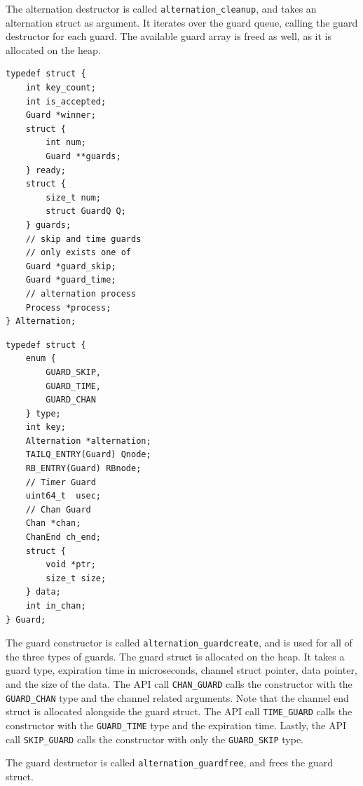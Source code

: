 The alternation destructor is called \texttt{alternation\_cleanup}, and takes an alternation struct as argument. It iterates over the guard queue, calling the guard destructor for each guard. The available guard array is freed as well, as it is allocated on the heap. 

\noindent\begin{minipage}{.45\textwidth}
\begin{lstlisting}[caption={Alternation type struct},style={CustomC},label={lst:alt_type_struct}]
typedef struct {
    int key_count;
    int is_accepted;
    Guard *winner;
    struct {
        int num;
        Guard **guards;
    } ready;
    struct {
        size_t num;
        struct GuardQ Q;
    } guards;
    // skip and time guards 
    // only exists one of
    Guard *guard_skip; 
    Guard *guard_time;
    // alternation process
    Process *process;
} Alternation;
\end{lstlisting}
\end{minipage}\hfill
\begin{minipage}{.45\textwidth}
\begin{lstlisting}[caption={Guard type struct},style={CustomC},label={lst:guard_type_struct}]
typedef struct {
    enum {
        GUARD_SKIP,
        GUARD_TIME,
        GUARD_CHAN
    } type;
    int key;
    Alternation *alternation;
    TAILQ_ENTRY(Guard) Qnode;
    RB_ENTRY(Guard) RBnode;
    // Timer Guard
    uint64_t  usec;
    // Chan Guard
    Chan *chan;
    ChanEnd ch_end;
    struct {
        void *ptr;
        size_t size;
    } data;
    int in_chan;
} Guard;
\end{lstlisting}
\end{minipage}

The guard constructor is called \texttt{alternation\_guardcreate}, and is used for all of the three types of guards. The guard struct is allocated on the heap. It takes a guard type, expiration time in microseconds, channel struct pointer, data pointer, and the size of the data. The API call \texttt{CHAN\_GUARD} calls the constructor with the \texttt{GUARD\_CHAN} type and the channel related arguments. Note that the channel end struct is allocated alongside the guard struct. The API call \texttt{TIME\_GUARD} calls the constructor with the \texttt{GUARD\_TIME} type and the expiration time. Lastly, the API call \texttt{SKIP\_GUARD} calls the constructor with only the \texttt{GUARD\_SKIP} type. 

The guard destructor is called \texttt{alternation\_guardfree}, and frees the guard struct.

